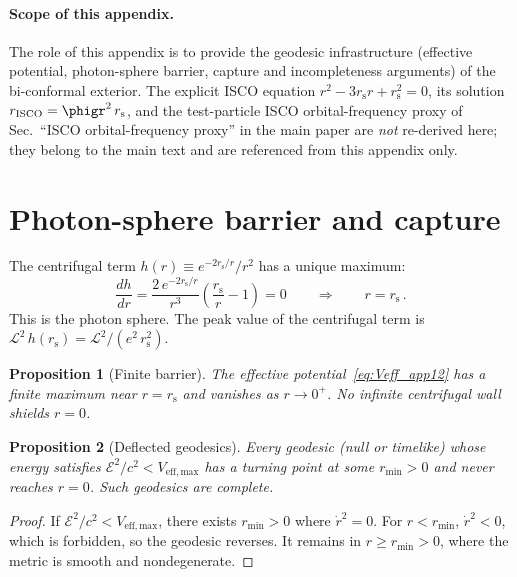 \documentclass[11pt]{article}
\newcommand{\rs}{r_{\mathrm{s}}}
\newtheorem{proposition}{Proposition}
\begin{document}
\paragraph{Scope of this appendix.}
The role of this appendix is to provide the geodesic
infrastructure (effective potential, photon-sphere
barrier, capture and incompleteness arguments) of the
bi-conformal exterior.  The explicit ISCO equation
$r^{2}-3\rs r+\rs^{2}=0$, its solution
$r_{\mathrm{ISCO}}=\phigr^{2}\,\rs$, and the
test-particle ISCO orbital-frequency proxy of
Sec.~``ISCO orbital-frequency proxy'' in the main paper
are
\emph{not} re-derived here; they belong to the main
text and are referenced from this appendix only.


\section{Photon-sphere barrier and capture}
\label{sec:capture}

The centrifugal term
$h(r) \equiv e^{-2\rs/r}/r^{2}$ has a unique maximum:
\begin{equation}
  \frac{dh}{dr} = \frac{2\,e^{-2\rs/r}}{r^{3}}
  \!\left(\frac{\rs}{r} - 1\right) = 0
  \qquad\Longrightarrow\qquad r = \rs\,.
\end{equation}
This is the photon sphere.  The peak value of the
centrifugal term is
$\mathcal{L}^{2}\,h(\rs) =
\mathcal{L}^{2}/(e^{2}\,\rs^{2})$.

\begin{proposition}[Finite barrier]\label{prop:barrier}
The effective potential~\eqref{eq:Veff_app12} has a finite
maximum near $r = \rs$ and vanishes as $r \to 0^{+}$.
No infinite centrifugal wall shields $r = 0$.
\end{proposition}

\begin{proposition}[Deflected geodesics]\label{prop:deflected}
Every geodesic (null or timelike) whose energy satisfies
$\mathcal{E}^{2}/c^{2} < V_{\mathrm{eff,max}}$
has a turning point at some $r_{\min} > 0$ and never
reaches $r = 0$.  Such geodesics are complete.
\end{proposition}
\begin{proof}
If $\mathcal{E}^{2}/c^{2} < V_{\mathrm{eff,max}}$,
there exists $r_{\min} > 0$ where
$\dot{r}^{2} = 0$.  For $r < r_{\min}$,
$\dot{r}^{2} < 0$, which is forbidden, so the geodesic
reverses.  It remains in $r \geq r_{\min} > 0$, where
the metric is smooth and nondegenerate.
\end{proof}
\end{document}
